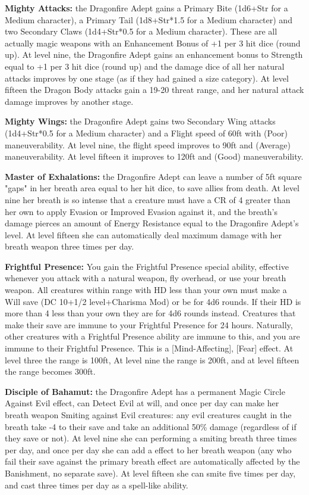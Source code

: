 \begin{itemize*}
\item \textbf{Mighty Attacks:} the Dragonfire Adept gains a Primary Bite (1d6+Str for a Medium character), a Primary Tail (1d8+Str*1.5 for a Medium character) and two Secondary Claws (1d4+Str*0.5 for a Medium character). These are all actually magic weapons with an Enhancement Bonus of +1 per 3 hit dice (round up). At level nine, the Dragonfire Adept gains an enhancement bonus to Strength equal to +1 per 3 hit dice (round up) and the damage dice of all her natural attacks improves by one stage (as if they had gained a size category). At level fifteen the Dragon Body attacks gain a 19-20 threat range, and her natural attack damage improves by another stage.
\item \textbf{Mighty Wings:} the Dragonfire Adept gains two Secondary Wing attacks (1d4+Str*0.5 for a Medium character) and a Flight speed of 60ft with (Poor) maneuverability. At level nine, the flight speed improves to 90ft  and (Average) maneuverability. At level fifteen it improves to 120ft and (Good) maneuverability.
\item \textbf{Master of Exhalations:} the Dragonfire Adept can leave a number of 5ft square "gaps" in her breath area equal to her hit dice, to save allies from death. At level nine her breath is so intense that a creature must have a CR of 4 greater than her own to apply Evasion or Improved Evasion against it, and the breath's damage pierces an amount of Energy Resistance equal to the Dragonfire Adept's level. At level fifteen she can automatically deal maximum damage with her breath weapon three times per day.
\item \textbf{Frightful Presence:} You gain the Frightful Presence special ability, effective whenever you attack with a natural weapon, fly overhead, or use your breath weapon. All creatures within range with HD less than your own must make a Will save (DC 10+1/2 level+Charisma Mod) or be  for 4d6 rounds. If their HD is more than 4 less than your own they are  for 4d6 rounds instead. Creatures that make their save are immune to your Frightful Presence for 24 hours. Naturally, other creatures with a Frightful Presence ability are immune to this, and you are immune to their Frightful Presence. This is a [Mind-Affecting], [Fear] effect. At level three the range is 100ft, At level nine the range is 200ft, and at level fifteen the range becomes 300ft.
\item \textbf{Disciple of Bahamut:} the Dragonfire Adept has a permanent Magic Circle Against Evil effect, can Detect Evil at will, and once per day can make her breath weapon Smiting against Evil creatures: any evil creatures caught in the breath take -4 to their save and take an additional 50\% damage (regardless of if they save or not). At level nine she can performing a smiting breath three times per day, and once per day she can add a  effect to her breath weapon (any who fail their save against the primary breath effect are automatically affected by the Banishment, no separate save). At level fifteen she can smite five times per day, and cast  three times per day as a spell-like ability.

\end{itemize*}
